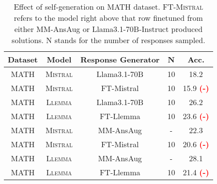 \begin{table}[h]
\centering
\small
\begin{tabular}{ccccc}
\hline
\textbf{Dataset} & \textbf{Model} & \textbf{Response Generator} & \textbf{N} & \textbf{Acc.} \\ \hline
MATH & \textsc{Mistral} & Llama3.1-70B      & 10 & 18.2     \\
\rowcolor[HTML]{F8E8E7} 
MATH & \textsc{Mistral} & FT-Mistral & 10 & 15.9 \textcolor{red}{\textbf{(-)} }\\ \hline
MATH & \textsc{Llemma}  & Llama3.1-70B      & 10 & 26.2     \\
\rowcolor[HTML]{F8E8E7} 
MATH & \textsc{Llemma}  & FT-Llemma  & 10 & 23.6 \textcolor{red}{\textbf{(-)} } \\ \hline
MATH & \textsc{Mistral} & MM-AnsAug   & -  & 22.3     \\
\rowcolor[HTML]{F8E8E7} 
MATH & \textsc{Mistral} & FT-Mistral & 10 & 20.6 \textcolor{red}{\textbf{(-)} } \\ \hline
MATH & \textsc{Llemma}  & MM-AnsAug   & -  & 28.1     \\
\rowcolor[HTML]{F8E8E7} 
MATH & \textsc{Llemma}  & FT-Llemma  & 10 & 21.4 \textcolor{red}{\textbf{(-)} }\\ \hline
\end{tabular}
\caption{Effect of self-generation on MATH dataset. \textsc{FT-Mistral} refers to the model right above that row finetuned from either MM-AnsAug or Llama3.1-70B-Instruct produced solutions. N stands for the number of responses sampled.}
\label{tab:self_gen_math}
\end{table}